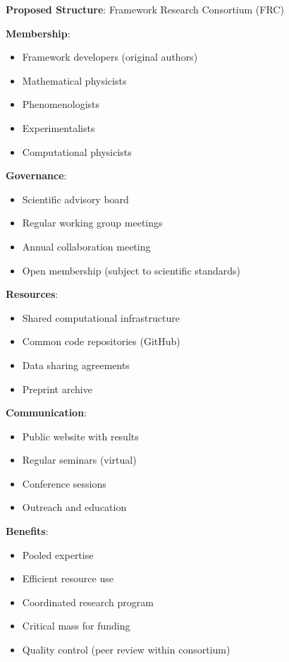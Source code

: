 \textbf{Proposed Structure}: Framework Research Consortium (FRC)

\textbf{Membership}:
\begin{itemize}
    \item Framework developers (original authors)
    \item Mathematical physicists
    \item Phenomenologists
    \item Experimentalists
    \item Computational physicists
\end{itemize}

\textbf{Governance}:
\begin{itemize}
    \item Scientific advisory board
    \item Regular working group meetings
    \item Annual collaboration meeting
    \item Open membership (subject to scientific standards)
\end{itemize}

\textbf{Resources}:
\begin{itemize}
    \item Shared computational infrastructure
    \item Common code repositories (GitHub)
    \item Data sharing agreements
    \item Preprint archive
\end{itemize}

\textbf{Communication}:
\begin{itemize}
    \item Public website with results
    \item Regular seminars (virtual)
    \item Conference sessions
    \item Outreach and education
\end{itemize}

\textbf{Benefits}:
\begin{itemize}
    \item Pooled expertise
    \item Efficient resource use
    \item Coordinated research program
    \item Critical mass for funding
    \item Quality control (peer review within consortium)
\end{itemize}

